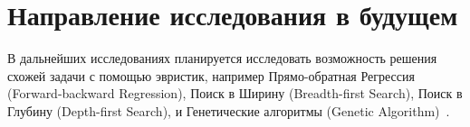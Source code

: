 \documentclass[preprint,12pt]{elsarticle}
\begin{document}
\section{Направление исследования в будущем}
В дальнейших исследованиях планируется исследовать возможность решения схожей задачи с помощью эвристик, например Прямо-обратная Регрессия (Forward-backward Regression), Поиск в Ширину (Breadth-first Search), Поиск в Глубину (Depth-first Search), и Генетические алгоритмы (Genetic Algorithm)~\cite{vorontcov2007lectures}.






\end{document}

